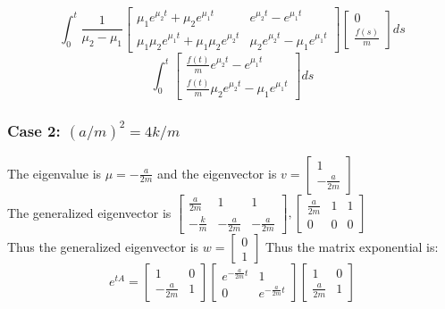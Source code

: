 \documentclass{article}
\begin{document}
$$\int_{0}^{t} \frac{1}{\mu_2-\mu_1}
\begin{bmatrix}
    \mu_1e^{\mu_2 t}  + \mu_2e^{\mu_1 t} & e^{\mu_2 t} - e^{\mu_1 t}\\
    \mu_1\mu_2e^{\mu_1 t} + \mu_1\mu_2e^{\mu_2 t} & \mu_2e^{\mu_2 t}-\mu_1e^{\mu_1 t}
\end{bmatrix}
 \begin{bmatrix}
    0\\
    \frac{f(s)}{m}
\end{bmatrix}ds$$
$$ \int_{0}^{t} \begin{bmatrix}
    \frac{f(t)}{m}e^{\mu_2 t} - e^{\mu_1 t} \\
    \frac{f(t)}{m}\mu_2e^{\mu_2 t}-\mu_1e^{\mu_1 t}
\end{bmatrix}ds$$ 
\subsubsection*{Case 2: $(a/m)^2 = 4k/m $}
The eigenvalue is $\mu = -\frac{a}{2m}$ and the eigenvector is $v = \begin{bmatrix}
    1\\
    -\frac{a}{2m}
\end{bmatrix}$\\
The generalized eigenvector is $\begin{bmatrix}
    \frac{a}{2m} & 1 & 1\\
    -\frac{k}{m} & -\frac{a}{2m} & -\frac{a}{2m}
\end{bmatrix}, \begin{bmatrix}
    \frac{a}{2m} & 1 & 1\\
    0 & 0 & 0
\end{bmatrix}$\\
Thus the generalized eigenvector is $w = \begin{bmatrix}
    0\\
    1
\end{bmatrix}$
Thus the matrix exponential is:
$$ e^{tA} = \begin{bmatrix}
    1 & 0\\
    -\frac{a}{2m} & 1
\end{bmatrix} \begin{bmatrix}
    e^{-\frac{a}{2m}t} & 1\\
    0 & e^{-\frac{a}{2m}t}
\end{bmatrix} \begin{bmatrix}
    1 & 0\\
    \frac{a}{2m} & 1
\end{bmatrix}$$
\end{document}
